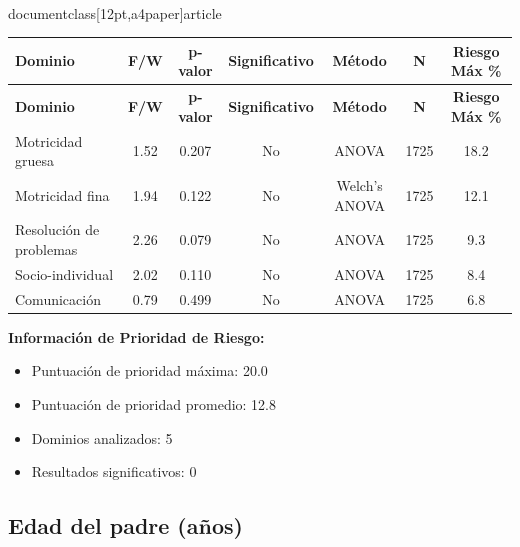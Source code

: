 \\documentclass[12pt,a4paper]{article}
\begin{document}
\begin{longtable}{|l|c|c|c|c|c|c|}
\hline
\textbf{Dominio} & \textbf{F/W} & \textbf{p-valor} & \textbf{Significativo} & \textbf{Método} & \textbf{N} & \textbf{Riesgo Máx \%} \\
\hline
\endfirsthead

\hline
\textbf{Dominio} & \textbf{F/W} & \textbf{p-valor} & \textbf{Significativo} & \textbf{Método} & \textbf{N} & \textbf{Riesgo Máx \%} \\
\hline
\endhead

\hline
\endfoot

\hline
\endlastfoot

Motricidad gruesa & 1.52 & 0.207 & No & ANOVA & 1725 & 18.2 \\
Motricidad fina & 1.94 & 0.122 & No & Welch's ANOVA & 1725 & 12.1 \\
Resolución de problemas & 2.26 & 0.079 & No & ANOVA & 1725 & 9.3 \\
Socio-individual & 2.02 & 0.110 & No & ANOVA & 1725 & 8.4 \\
Comunicación & 0.79 & 0.499 & No & ANOVA & 1725 & 6.8 \\

\end{longtable}


\textbf{Información de Prioridad de Riesgo:}
\begin{itemize}
\item Puntuación de prioridad máxima: 20.0
\item Puntuación de prioridad promedio: 12.8
\item Dominios analizados: 5
\item Resultados significativos: 0
\end{itemize}


\subsection{Edad del padre (años)}
\end{document}
